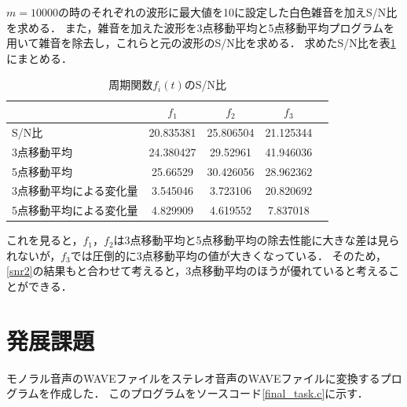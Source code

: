 \documentclass[titlepage]{jarticle}
\begin{document}
$m=10000$の時のそれぞれの波形に最大値を10に設定した白色雑音を加えS/N比を求める．
また，雑音を加えた波形を3点移動平均と5点移動平均プログラムを用いて雑音を除去し，これらと元の波形のS/N比を求める．
求めたS/N比を表\ref{tab:task}にまとめる．
\begin{table}[H]
  \caption{周期関数$f_{i}(t)$のS/N比}
  \label{tab:task}
  \centering
  \begin{tabular}{l|cccc}\hline
                            & $f_{1}$   & $f_{2}$   & $f_{3}$   \\\hline\hline
    S/N比                   & 20.835381 & 25.806504 & 21.125344 \\
    3点移動平均             & 24.380427 & 29.52961  & 41.946036 \\
    5点移動平均             & 25.66529  & 30.426056 & 28.962362 \\
    3点移動平均による変化量 & 3.545046  & 3.723106  & 20.820692 \\
    5点移動平均による変化量 & 4.829909  & 4.619552  & 7.837018  \\\hline
  \end{tabular}
\end{table}
これを見ると，$f_{1}$，$f_{2}$は3点移動平均と5点移動平均の除去性能に大きな差は見られないが，$f_{3}$では圧倒的に3点移動平均の値が大きくなっている．
そのため，\ref{snr2}の結果もと合わせて考えると，3点移動平均のほうが優れていると考えることができる．
\section{発展課題}
モノラル音声のWAVEファイルをステレオ音声のWAVEファイルに変換するプログラムを作成した．
このプログラムをソースコード\ref{final_task.c}に示す．
\end{document}
